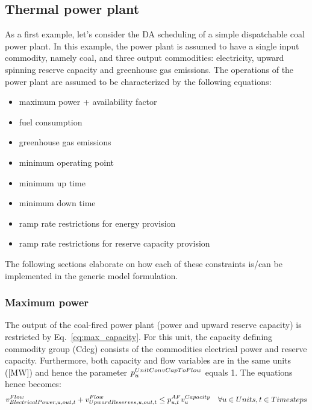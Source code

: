 \documentclass[10pt,english]{article}
\begin{document}
\subsection{Thermal power plant}
As a first example, let's consider the DA scheduling of a simple dispatchable coal power plant. In this example, the power plant is assumed to have a single input commodity, namely coal, and three output commodities: electricity, upward spinning reserve capacity and greenhouse gas emissions. The operations of the power plant are assumed to be characterized by the following equations:
\begin{itemize}
\item maximum power + availability factor 
\item fuel consumption
\item greenhouse gas emissions
\item minimum operating point
\item minimum up time
\item minimum down time
\item ramp rate restrictions for energy provision
\item ramp rate restrictions for reserve capacity provision
\end{itemize}

The following sections elaborate on how each of these constraints is/can be implemented in the generic model formulation.

\subsubsection{Maximum power}
The output of the coal-fired power plant (power and upward reserve capacity) is restricted by Eq.~\eqref{eq:max_capacity}. For this unit, the capacity defining commodity group (Cdcg) consists of the commodities electrical power and reserve capacity. Furthermore, both capacity and flow variables are in the same units ([MW]) and hence the parameter $\pUnitConvCapToFlow$ equals 1. The equations hence becomes:
\begin{align}
\vFlow[ElectricalPower,u,out,t] + \vFlow[UpwardReserves,u,out,t] \le \pAF \vCapacity \quad \forall \units, \timesteps \nonumber
\end{align}
\end{document}
